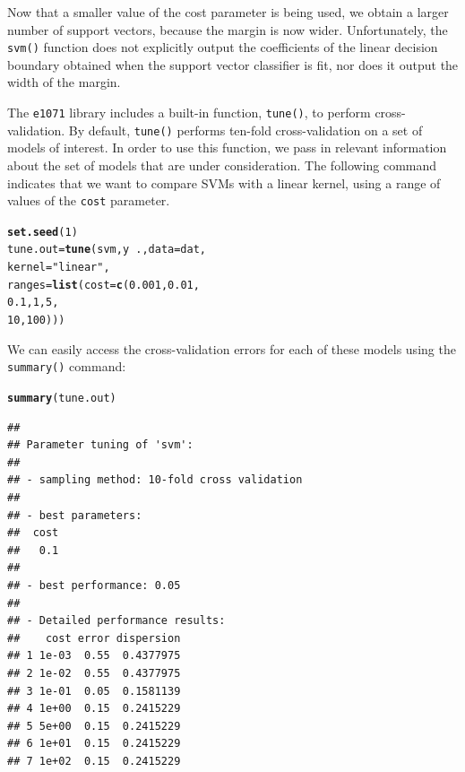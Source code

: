 \documentclass[12pt]{article}\usepackage[]{graphicx}\usepackage[]{color}
\makeatletter
\newcommand{\hlnum}[1]{\textcolor[rgb]{0.686,0.059,0.569}{#1}}%
\newcommand{\hlstr}[1]{\textcolor[rgb]{0.192,0.494,0.8}{#1}}%
\newcommand{\hlopt}[1]{\textcolor[rgb]{0,0,0}{#1}}%
\newcommand{\hlstd}[1]{\textcolor[rgb]{0.345,0.345,0.345}{#1}}%
\newcommand{\hlkwb}[1]{\textcolor[rgb]{0.69,0.353,0.396}{#1}}%
\newcommand{\hlkwc}[1]{\textcolor[rgb]{0.333,0.667,0.333}{#1}}%
\newcommand{\hlkwd}[1]{\textcolor[rgb]{0.737,0.353,0.396}{\textbf{#1}}}%
\newenvironment{kframe}{%
 \def\at@end@of@kframe{}%
 \ifinner\ifhmode%
  \def\at@end@of@kframe{\end{minipage}}%
  \begin{minipage}{\columnwidth}%
 \fi\fi%
 \def\FrameCommand##1{\hskip\@totalleftmargin \hskip-\fboxsep
 \colorbox{shadecolor}{##1}\hskip-\fboxsep
     \hskip-\linewidth \hskip-\@totalleftmargin \hskip\columnwidth}%
 \MakeFramed {\advance\hsize-\width
   \@totalleftmargin\z@ \linewidth\hsize
   \@setminipage}}%
 {\par\unskip\endMakeFramed%
 \at@end@of@kframe}
\newenvironment{knitrout}{}{} %
\makeatother
\begin{document}
Now that a smaller value of the cost parameter is being used, we obtain a larger number of support vectors, because the margin is now wider. Unfortunately, the \texttt{svm()} function does not explicitly output the coefficients of the linear decision boundary obtained when the support vector classifier is fit, nor does it output the width of the margin.

The \texttt{e1071} library includes a built-in function, \texttt{tune()}, to perform cross-validation. By default, \texttt{tune()} performs ten-fold cross-validation on a set of models of interest. In order to use this function, we pass in relevant information about the set of models that are under consideration. The following command indicates that we want to compare SVMs with a linear kernel, using a range of values of the \texttt{cost} parameter.

\begin{knitrout}
\color{fgcolor}\begin{kframe}
\begin{alltt}
\hlkwd{set.seed}\hlstd{(}\hlnum{1}\hlstd{)}
\hlstd{tune.out} \hlkwb{=} \hlkwd{tune}\hlstd{(svm, y}\hlopt{~}\hlstd{.,} \hlkwc{data}\hlstd{=dat,}
                \hlkwc{kernel}\hlstd{=}\hlstr{"linear"}\hlstd{,}
                \hlkwc{ranges} \hlstd{=} \hlkwd{list}\hlstd{(}\hlkwc{cost}\hlstd{=}\hlkwd{c}\hlstd{(}\hlnum{0.001}\hlstd{,} \hlnum{0.01}\hlstd{,}
                                     \hlnum{0.1}\hlstd{,} \hlnum{1}\hlstd{,} \hlnum{5}\hlstd{,}
                                     \hlnum{10}\hlstd{,} \hlnum{100}\hlstd{)))}
\end{alltt}
\end{kframe}
\end{knitrout}

We can easily access the cross-validation errors for each of these models using the \texttt{summary()} command:

\begin{knitrout}
\color{fgcolor}\begin{kframe}
\begin{alltt}
\hlkwd{summary}\hlstd{(tune.out)}
\end{alltt}
\begin{verbatim}
## 
## Parameter tuning of 'svm':
## 
## - sampling method: 10-fold cross validation 
## 
## - best parameters:
##  cost
##   0.1
## 
## - best performance: 0.05 
## 
## - Detailed performance results:
##    cost error dispersion
## 1 1e-03  0.55  0.4377975
## 2 1e-02  0.55  0.4377975
## 3 1e-01  0.05  0.1581139
## 4 1e+00  0.15  0.2415229
## 5 5e+00  0.15  0.2415229
## 6 1e+01  0.15  0.2415229
## 7 1e+02  0.15  0.2415229
\end{verbatim}
\end{kframe}
\end{knitrout}
\end{document}
